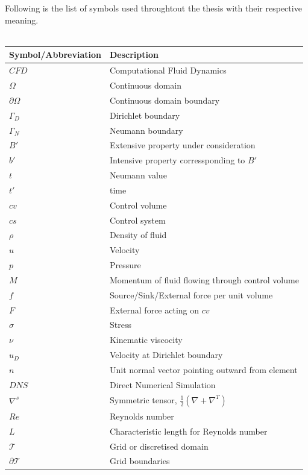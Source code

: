 \documentclass[a4paper]{book}
\begin{document}
Following is the list of symbols used throughtout the thesis with their respective meaning.\\
${}$\\
\begin{longtable}{| p{} | p{} |}
\hline
\textbf{Symbol/Abbreviation} & \textbf{Description}\\
\hline
$CFD$ & Computational Fluid Dynamics\\
\hline
$\Omega$ & Continuous domain\\
\hline
$\partial \Omega$ & Continuous domain boundary\\
\hline
$\Gamma_D$ & Dirichlet boundary\\
\hline
$\Gamma_N$ & Neumann boundary\\
\hline
$B'$ & Extensive property under consideration \\
\hline
$b'$ & Intensive property corressponding to $B'$\\
\hline
$t$ & Neumann value\\
\hline
$t'$ & time\\
\hline
$cv$ & Control volume\\
\hline
$cs$ & Control system\\
\hline
$\rho$ & Density of fluid \\
\hline
$u$ & Velocity\\
\hline
$p$ & Pressure\\
\hline
$M$ & Momentum of fluid flowing through control volume\\
\hline
$f$ & Source/Sink/External force per unit volume\\
\hline
$F$ & External force acting on $cv$\\
\hline
$\sigma$ & Stress\\
\hline
$\nu$ & Kinematic viscocity\\
\hline
$u_D$ & Velocity at Dirichlet boundary\\
\hline
$n$ & Unit normal vector pointing outward from element\\
\hline
$DNS$ & Direct Numerical Simulation\\
\hline
$\nabla^s$ & Symmetric tensor, $\frac{1}{2} (\nabla + \nabla^T)$\\
\hline
$Re$ & Reynolds number\\
\hline
$L$ & Characteristic length for Reynolds number\\
\hline
$\mathcal{T}$ & Grid or discretised domain\\
\hline
$\partial \mathcal{T}$ & Grid boundaries\\

\end{longtable}
\end{document}
